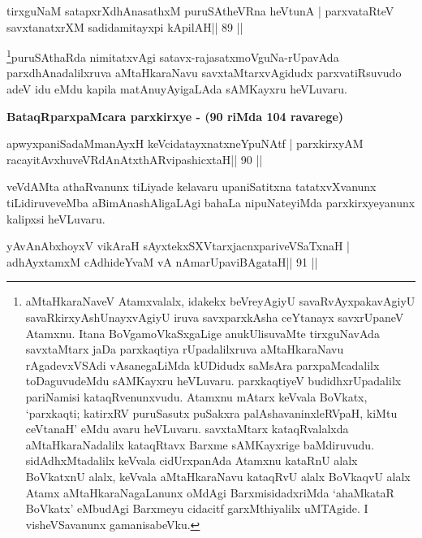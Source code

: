 
\begin{shl}
tirxguNaM satapxrXdhAnasathxM puruSAtheVRna heVtunA |
parxvataRteV savxtanatxrXM sadidamitayxpi kApilAH\hfill || 89 ||
\end{shl}

\begin{artha}
\footnote{aMtaHkaraNaveV Atamxvalalx, idakekx beVreyAgiyU 
savaRvAyxpakavAgiyU savaRkirxyAshUnayxvAgiyU iruva savxparxkAsha ceYtanayx
  savxrUpaneV Atamxnu. Itana BoVgamoVkaSxgaLige anukUlisuvaMte
  tirxguNavAda savxtaMtarx jaDa parxkaqtiya rUpadalilxruva 
  aMtaHkaraNavu rAgadevxVSAdi vAsanegaLiMda kUDidudx saMsAra parxpaMcadalilx
toDaguvudeMdu sAMKayxru heVLuvaru. parxkaqtiyeV budidhxrUpadalilx
pariNamisi kataqRvenunxvudu. Atamxnu mAtarx keVvala BoVkatx,
`parxkaqti; katirxRV puruSasutx puSakxra palAshavaninxleRVpaH, kiMtu
ceVtanaH' eMdu avaru heVLuvaru. savxtaMtarx kataqRvalalxda
aMtaHkaraNadalilx kataqRtavx Barxme sAMKayxrige baMdiruvudu.
sidAdhxMtadalilx keVvala cidUrxpanAda Atamxnu kataRnU alalx BoVkatxnU
alalx, keVvala aMtaHkaraNavu kataqRvU alalx BoVkaqvU alalx Atamx
aMtaHkaraNagaLanunx oMdAgi BarxmisidadxriMda `ahaMkataR BoVkatx'
eMbudAgi Barxmeyu cidacitf garxMthiyalilx uMTAgide. I visheVSavanunx gamanisabeVku.}puruSAthaRda nimitatxvAgi
satavx-rajasatxmoVguNa-rUpavAda parxdhAnadalilxruva aMtaHkaraNavu
savxtaMtarxvAgidudx parxvatiRsuvudo adeV idu eMdu kapila
matAnuyAyigaLAda sAMKayxru heVLuvaru.
\end{artha}

{\centerline{\textbf{BataqRparxpaMcara parxkirxye - (90 riMda 104 ravarege)}}}

\medskip

\begin{shl}
apwyxpaniSadaMmanAyxH keVcidatayxnatxneYpuNAtf |
parxkirxyAM racayitAvx\s\s huveVRdAnAtxthARvipashicxtaH\hfill || 90 ||
\end{shl}

\begin{artha}
veVdAMta athaRvanunx tiLiyade kelavaru upaniSatitxna tatatxvXvanunx tiLidiruveveMba aBimAnashAligaLAgi bahaLa nipuNateyiMda parxkirxyeyanunx kalipxsi heVLuvaru.
\end{artha}

\begin{shl}
yAvAnAbxhoyxV vikAraH sAyxtekxSXVtarxjacnxpariveVSaTxnaH |
adhAyxtamxM cAdhideYvaM vA nAmarUpaviBAgataH\hfill || 91 ||
\end{shl}

